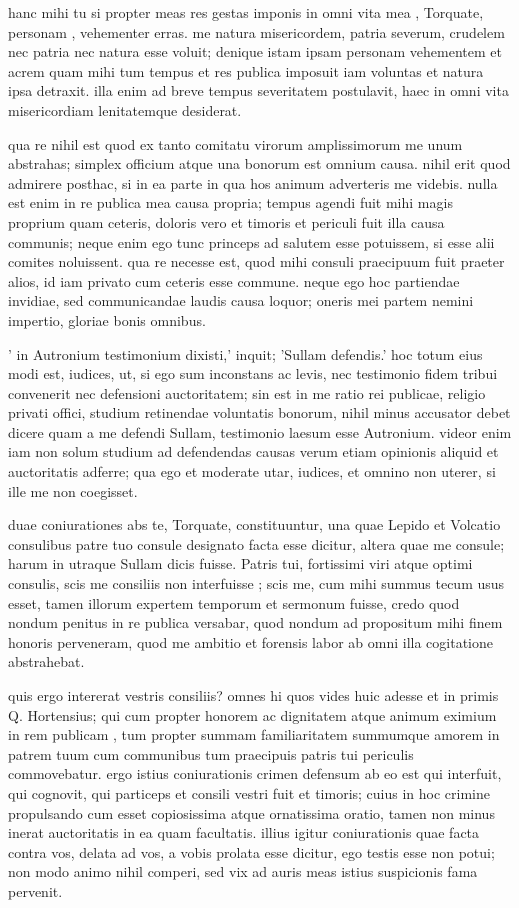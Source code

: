  hanc mihi tu si propter meas res gestas imponis in omni vita mea , Torquate, personam , vehementer erras. me natura misericordem, patria severum, crudelem nec patria nec natura esse voluit; denique istam ipsam personam vehementem et acrem quam mihi tum tempus et res publica imposuit iam voluntas et natura ipsa detraxit. illa enim ad breve tempus severitatem postulavit, haec in omni vita misericordiam lenitatemque desiderat.

 qua re nihil est quod ex tanto comitatu virorum amplissimorum me unum abstrahas; simplex officium atque una bonorum est omnium causa. nihil erit quod admirere posthac, si in ea parte in qua hos animum adverteris me videbis. nulla est enim in re publica mea causa propria; tempus agendi fuit mihi magis proprium quam ceteris, doloris vero et timoris et periculi fuit illa causa communis; neque enim ego tunc princeps ad salutem esse potuissem, si esse alii comites noluissent. qua re necesse est, quod mihi consuli praecipuum fuit praeter alios, id iam privato cum ceteris esse commune. neque ego hoc partiendae invidiae, sed communicandae laudis causa loquor; oneris mei partem nemini impertio, gloriae bonis omnibus.

 ' in Autronium testimonium dixisti,' inquit; 'Sullam defendis.' hoc totum eius modi est, iudices, ut, si ego sum inconstans ac levis, nec testimonio fidem tribui convenerit nec defensioni auctoritatem; sin est in me ratio rei publicae, religio privati offici, studium retinendae voluntatis bonorum, nihil minus accusator debet dicere quam a me defendi Sullam, testimonio laesum esse Autronium. videor enim iam non solum studium ad defendendas causas verum etiam opinionis aliquid et auctoritatis adferre; qua ego et moderate utar, iudices, et omnino non uterer, si ille me non coegisset.

 duae coniurationes abs te, Torquate, constituuntur, una quae Lepido et Volcatio consulibus patre tuo consule designato facta esse dicitur, altera quae me consule; harum in utraque Sullam dicis fuisse. Patris tui, fortissimi viri atque optimi consulis, scis me consiliis non interfuisse ; scis me, cum mihi summus tecum usus esset, tamen illorum expertem temporum et sermonum fuisse, credo quod nondum penitus in re publica versabar, quod nondum ad propositum mihi finem honoris perveneram, quod me ambitio et forensis labor ab omni illa cogitatione abstrahebat.

 quis ergo intererat vestris consiliis? omnes hi quos vides huic adesse et in primis Q. Hortensius; qui cum propter honorem ac dignitatem atque animum eximium in rem publicam , tum propter summam familiaritatem summumque amorem in patrem tuum cum communibus tum praecipuis patris tui periculis commovebatur. ergo istius coniurationis crimen defensum ab eo est qui interfuit, qui cognovit, qui particeps et consili vestri fuit et timoris; cuius in hoc crimine propulsando cum esset copiosissima atque ornatissima oratio, tamen non minus inerat auctoritatis in ea quam facultatis. illius igitur coniurationis quae facta contra vos, delata ad vos, a vobis prolata esse dicitur, ego testis esse non potui; non modo animo nihil comperi, sed vix ad auris meas istius suspicionis fama pervenit.

